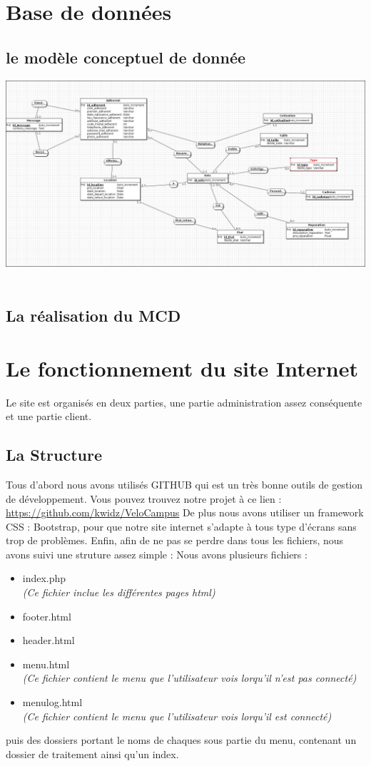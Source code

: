 \documentclass[11pt,a4paper,titlepage]{report}
\begin{document}
\chapter{Base de données}
\section{le modèle conceptuel de donnée}
\begin{center}
\includegraphics[width=1\textwidth]{MCD.jpg}~
\end{center}

\section{La réalisation du MCD}

\chapter{Le fonctionnement du site Internet}
Le site est organisés en deux parties, une partie administration assez conséquente et une partie client.
\section{La Structure}
Tous d'abord nous avons utilisés GITHUB qui est un très bonne outils de gestion de développement.
Vous pouvez trouvez notre projet à ce lien :
\url{https://github.com/kwidz/VeloCampus}
De plus nous avons utiliser un framework CSS : Bootstrap, pour que notre site internet s'adapte à tous type d'écrans sans trop de problèmes.
Enfin, afin de ne pas se perdre dans tous les fichiers, nous avons suivi une struture assez simple : Nous avons plusieurs fichiers :
\begin{itemize}
\item index.php \\
\textit{(Ce fichier inclue les différentes pages html)}
\item footer.html
\item header.html
\item menu.html \\
\textit{(Ce fichier contient le menu que l'utilisateur vois lorqu'il n'est pas connecté)}
\item menulog.html \\
\textit{(Ce fichier contient le menu que l'utilisateur vois lorqu'il est connecté)}
\end{itemize}
 puis des dossiers portant le noms de chaques sous partie du menu, contenant un dossier de traitement ainsi qu'un index.
 
\end{document}
